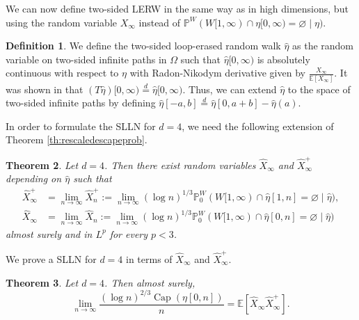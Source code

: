 \documentclass{article}
\DeclareMathOperator{\Ca}{Cap}
\renewcommand{\P}{\mathbb{P}}
\newcommand{\E}{\mathbb{E}}
\newcommand{\1}{\mathbf{1}}
\newcommand{\limn}{\lim_{n\rightarrow\infty}}
\newcommand{\heta}{\hat\eta}
\newcommand{\Xh}{\hat X}
\newcommand{\Xhi}{\Xh_\infty}
\newcommand{\Xhip}{\Xhi^+}
\newtheorem{theorem}{Theorem}
\theoremstyle{definition}
\newtheorem{definition}[theorem]{Definition}
\numberwithin{equation}{section}
\numberwithin{theorem}{section}
\begin{document}
We can now define two-sided LERW in the same way as in high dimensions, but using the random variable $X_\infty$ instead of $\P^W(W[1,\infty)\cap\eta[0,\infty)=\varnothing\mid\eta)$.
\begin{definition}
We define the two-sided loop-erased random walk $\heta$ as the random variable on two-sided infinite paths in $\Omega$ such that $\heta[0,\infty)$ is absolutely continuous with respect to $\eta$ with Radon-Nikodym derivative given by $\frac{X_\infty}{\E[X_\infty]}$. It was shown in \cite{lawler19fourdimensional} that $(T\heta)[0,\infty)\stackrel{d}{=}\heta[0,\infty)$. Thus, we can extend $\heta$ to the space of two-sided infinite paths by defining $\heta[-a,b]\stackrel{d}{=}\heta[0,a+b]-\heta(a)$.
\end{definition}

In order to formulate the SLLN for $d=4$, we need the following extension of Theorem \ref{th:rescaledescapeprob}.
\begin{theorem}\label{th:Xhat}
Let $d=4$. Then there exist random variables $\Xhi$ and $\Xhip$ depending on $\heta$ such that
\begin{equation}\label{eq:def-Xhat}
    \begin{split}
        \hat{X}^+_\infty&=\limn \hat{X}^+_n:=\limn(\log n)^{1/3}\P^W_0(W[1,\infty)\cap\hat{\eta}[1,n]=\varnothing\mid \heta),\\
        \hat{X}_\infty&=\limn \hat{X}_n:=\limn(\log n)^{1/3}\P^W_0(W[1,\infty)\cap\hat{\eta}[0,n]=\varnothing\mid \heta)
    \end{split}
\end{equation}
almost surely and in $L^p$ for every $p<3$.
\end{theorem}
We prove a SLLN for $d=4$ in terms of $\hat{X}_\infty$ and $\hat{X}^+_\infty$.
\begin{theorem}\label{th:d4}
Let $d=4$. Then almost surely,
\begin{equation}
    \limn\frac{(\log n)^{2/3}\Ca(\eta[0,n])}{n}=\E[\Xh_\infty\Xh^+_\infty].
\end{equation}
\end{theorem}
\end{document}
